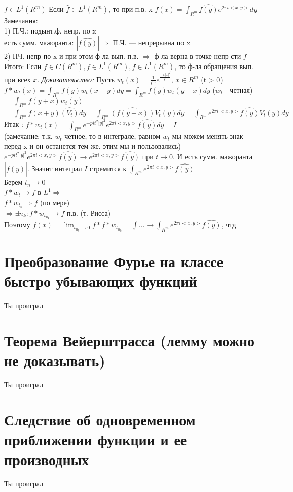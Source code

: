 \documentclass[paper=a4, fontsize=14pt]{report}
\begin{document}
$f \in L^1(R^m)$
Если $\hat{f} \in L^1(R^m)$, то при п.в. x $f(x) = \int_{R^m} \hat{f(y)} e^{2\pi i <x, y>} dy$ \\
Замечания: \\
1) П.Ч.: подынт.ф. непр. по x \\
есть сумм. мажоранта: $|\hat{f(y)}| \Rightarrow $ П.Ч. --- непрерывна по x \\
2) ПЧ. непр по x и при этом ф-ла вып. п.в. $\Rightarrow$ ф-ла верна в точке непр-сти $f$ \\
Итого: Если $f \in C(R^m), f \in L^1(R^m), \hat{f} \in L^1(R^m)$, то ф-ла обращения вып. при всех $x$.
\emph{Доказательство:}
Пусть $w_t(x) = \frac{1}{t^m} e^{\frac{-\pi |x|^2}{t^2}}$, $x \in R^m$ (t > 0) \\
$f * w_t(x) = \int_{R^m} f(y) w_t(x-y) dy = \int_{R^m} f(y)w_t(y-x)dy$ ($w_t$ - четная) $ = \int_{R^m}f(y+x)w_t(y)$
$= \int_{R^m} f(x+y) \hat{(V_t)} dy = \int_{R^m} \hat{(f(y+x))} V_t(y) dy = \int_{R^m} e^{2 \pi i <x, y>} \hat{f(y)} V_t(y) dy$\\
Итак : $f * w_t(x) = \int_{R^m} e^{-pi t^2 |y|^2} e^{2 \pi i <x, y>} \hat{f(y)} dy = I$ \\
(замечание: т.к. $w_t$ четное, то в интеграле, равном $w_t$ мы можем менять знак перед x и он останется тем же. этим мы и пользовались) \\
$e^{-pi t^2 |y|^2} e^{2 \pi i <x, y>} \hat{f(y)}  \rightarrow e^{2 \pi i <x, y>} \hat{f(y)}$ при $t \rightarrow 0$. И есть сумм. мажоранта $|\hat{f(y)}|$. Значит интеграл $I$ стремится к $\int_{R^m} e^{2 \pi i <x, y>} \hat{f(y)}$\\
Берем $t_n \rightarrow 0$\\
$f*w_t \rightarrow f$ в $L^1 \Rightarrow $\\
$f*w_{t_n} \Rightarrow f$ (по мере)\\
$\Rightarrow \exists n_k : f*w_{t_{n_k}} \rightarrow f$ п.в. (т. Рисса) \\
Поэтому $f(x) = \lim_{t_{n_k} \rightarrow 0} f*f*w_{t_{n_k}} = \int \dots \rightarrow \int_{R^m} e^{2 \pi i <x, y>} \hat{f(y)}$, чтд


\section{Преобразование Фурье на классе быстро убывающих функций}

Ты проиграл

\section{Теорема Вейерштрасса (лемму можно не доказывать)}

Ты проиграл

\section{Следствие об одновременном приближении функции и ее производных}

Ты проиграл
\end{document}
